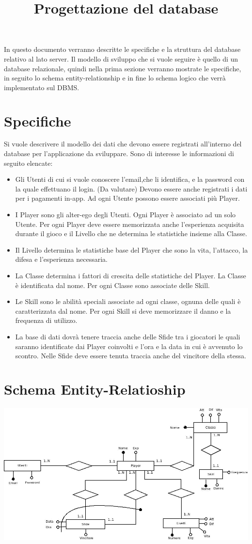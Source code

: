 \documentclass[a4paper,12pt]{article}
\title{Progettazione del database}
\begin{document}
\maketitle

In questo documento verranno descritte le specifiche e la struttura del database relativo al lato server. Il modello di sviluppo che si vuole seguire è quello di un database relazionale, quindi nella prima sezione verranno mostrate le specifiche, in seguito lo schema entity-relationship e in fine lo schema logico che verrà implementato sul DBMS. 

\section*{Specifiche}
Si vuole descrivere il modello dei dati che devono essere registrati all'interno del database per l'applicazione da sviluppare. Sono di interesse le informazioni di seguito elencate:
\begin{itemize}
\item Gli Utenti di cui si vuole conoscere l'email,che li identifica, e la password con la quale effettuano il login. (Da valutare) Devono essere anche registrati i dati per i pagamenti in-app. Ad ogni Utente possono essere associati più Player.
\item I Player sono gli alter-ego degli Utenti. Ogni Player è associato ad un solo Utente. Per ogni Player deve essere memorizzata anche l'esperienza acquisita durante il gioco e il Livello che ne determina le statistiche insieme alla Classe.
\item Il Livello determina le statistiche base del Player che sono la vita, l'attacco, la difesa e l'esperienza necessaria.
\item La Classe determina i fattori di crescita delle statistiche del Player. La Classe è identificata dal nome. Per ogni Classe sono associate delle Skill.
\item Le Skill sono le abilità speciali associate ad ogni classe, ognuna delle quali è caratterizzata dal nome. Per ogni Skill si deve memorizzare il danno e la frequenza di utilizzo.
\item La base di dati dovrà tenere traccia anche delle Sfide tra i giocatori le quali saranno identificate dai Player coinvolti e l'ora e la data in cui è avvenuto lo scontro. Nelle Sfide deve essere tenuta traccia anche del vincitore della stessa.
\end{itemize} 
\section*{Schema Entity-Relatioship}
\includegraphics[scale=0.4]{SchemaER.jpeg}
\end{document}
